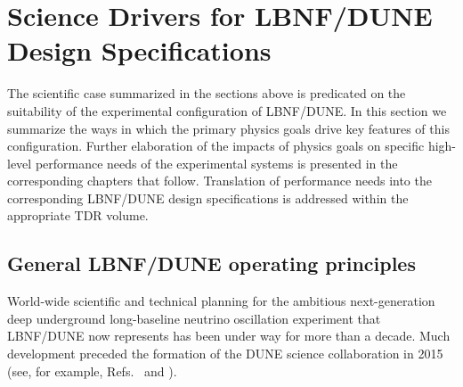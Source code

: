 \section{Science Drivers for LBNF/DUNE Design Specifications}
\label{sec:exec-key-reqs}

The scientific case summarized in the sections above
is predicated on the suitability of the experimental
configuration of LBNF/DUNE.  In this section we summarize
the ways in which the primary physics goals drive key features
of this configuration.  Further elaboration of the impacts of
physics goals on specific high-level performance needs of the
experimental systems is presented in the corresponding chapters
that follow.  Translation of performance needs into the
corresponding LBNF/DUNE design specifications is addressed within
the appropriate TDR volume.

\subsection{General LBNF/DUNE operating principles}

World-wide scientific and technical planning for the
ambitious next-generation deep underground long-baseline
neutrino oscillation experiment that LBNF/DUNE now represents
has been under way for more than a decade.  Much
development preceded the formation of the DUNE science
collaboration in 2015 (see, for example,
Refs.~\cite{Adams:2013qkq} and \cite{LAGUNA-LBNO-deliv}).

